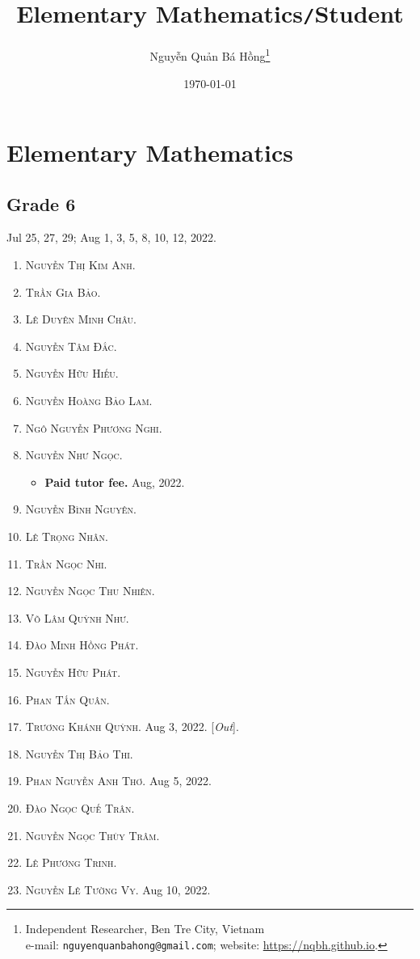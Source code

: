\documentclass{article}
\title{Elementary Mathematics\texttt{/}Student}
\author{\selectlanguage{vietnamese} Nguyễn Quản Bá Hồng\footnote{Independent Researcher, Ben Tre City, Vietnam\\e-mail: \texttt{nguyenquanbahong@gmail.com}; website: \url{https://nqbh.github.io}.}}
\date{\today}
\numberwithin{equation}{section}
\begin{document}
\maketitle
{}
\begin{abstract}
	
\end{abstract}

\tableofcontents
{}


\section{Elementary Mathematics}

\subsection{Grade 6}
Jul 25, 27, 29; Aug 1, 3, 5, 8, 10, 12, 2022.
\begin{enumerate}
	\item \textsc{Nguyễn Thị Kim Anh.}
	\item \textsc{Trần Gia Bảo.}
	\item \textsc{Lê Duyên Minh Châu.}
	\item \textsc{Nguyễn Tâm Đắc.}
	\item \textsc{Nguyễn Hữu Hiếu.}
	\item \textsc{Nguyễn Hoàng Bảo Lam.}
	\item \textsc{Ngô Nguyễn Phương Nghi.}
	\item \textsc{Nguyễn Như Ngọc.}
	\begin{itemize}
		\item \textbf{Paid tutor fee.} Aug, 2022.
	\end{itemize}
	\item \textsc{Nguyễn Bình Nguyên.}
	\item \textsc{Lê Trọng Nhân.}
	\item \textsc{Trần Ngọc Nhi.}
	\item \textsc{Nguyễn Ngọc Thu Nhiên.}
	\item \textsc{Võ Lâm Quỳnh Như.}
	\item \textsc{Đào Minh Hồng Phát.}
	\item \textsc{Nguyễn Hữu Phát.}
	\item \textsc{Phan Tấn Quân.}
	\item \textsc{Trương Khánh Quỳnh.} Aug 3, 2022. [\textit{Out}].
	\item \textsc{Nguyễn Thị Bảo Thi.}
	\item \textsc{Phan Nguyễn Anh Thơ.} Aug 5, 2022.
	\item \textsc{Đào Ngọc Quế Trân.}
	\item \textsc{Nguyễn Ngọc Thùy Trâm.}
	\item \textsc{Lê Phương Trinh.}
	\item \textsc{Nguyễn Lê Tường Vy.} Aug 10, 2022.
\end{enumerate}
\end{document}
